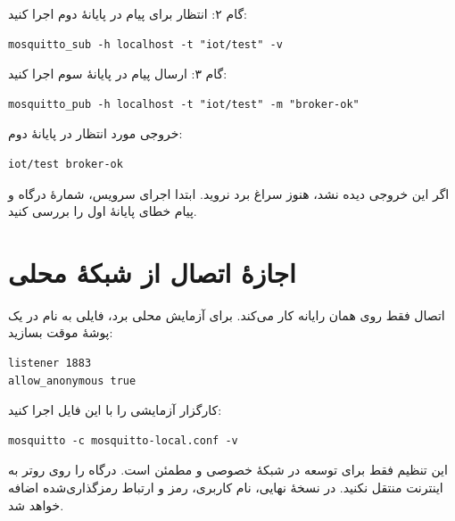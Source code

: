 \begin{stepbox}{گام ۲: انتظار برای پیام}
در پایانهٔ دوم اجرا کنید:

\begin{LTR}
\begin{lstlisting}
mosquitto_sub -h localhost -t "iot/test" -v
\end{lstlisting}
\end{LTR}
\end{stepbox}

\begin{stepbox}{گام ۳: ارسال پیام}
در پایانهٔ سوم اجرا کنید:

\begin{LTR}
\begin{lstlisting}
mosquitto_pub -h localhost -t "iot/test" -m "broker-ok"
\end{lstlisting}
\end{LTR}
\end{stepbox}

خروجی مورد انتظار در پایانهٔ دوم:

\begin{LTR}
\begin{lstlisting}
iot/test broker-ok
\end{lstlisting}
\end{LTR}

اگر این خروجی دیده نشد، هنوز سراغ برد نروید. ابتدا اجرای سرویس، شمارهٔ درگاه و پیام خطای پایانهٔ اول را بررسی کنید.

\section{اجازهٔ اتصال از شبکهٔ محلی}
اتصال
فقط روی همان رایانه کار می‌کند. برای آزمایش محلی برد، فایلی به نام
در یک پوشهٔ موقت بسازید:

\begin{LTR}
\begin{lstlisting}
listener 1883
allow_anonymous true
\end{lstlisting}
\end{LTR}

کارگزار آزمایشی را با این فایل اجرا کنید:

\begin{LTR}
\begin{lstlisting}
mosquitto -c mosquitto-local.conf -v
\end{lstlisting}
\end{LTR}

\begin{notebox}
این تنظیم فقط برای توسعه در شبکهٔ خصوصی و مطمئن است. درگاه
را روی روتر به اینترنت منتقل نکنید. در نسخهٔ نهایی، نام کاربری، رمز و ارتباط رمزگذاری‌شده اضافه خواهد شد.
\end{notebox}

